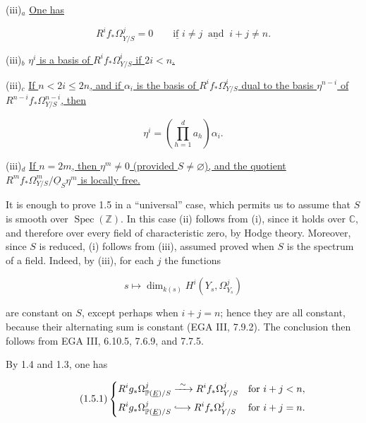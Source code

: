 \noindent(iii)$_a$ \underline{One has}

\begin{equation*}
R^if_*\Omega^j_{Y/S}=0
\qquad\underline{\text{if }}i\ne j\ \underline{\text{ and }}\ i+j\ne n.
\end{equation*}


\noindent(iii)$_b$ \underline{$\eta^i$ is a basis of
$R^if_*\Omega^i_{Y/S}$ if $2i<n$.}

\noindent(iii)$_c$ \underline{If $n<2i\leq2n$, and if $\alpha_i$ is the
basis of $R^if_*\Omega^i_{Y/S}$ dual to the basis $\eta^{n-i}$ of
$R^{n-i}f_*\Omega^{n-i}_{Y/S}$, then}

\begin{equation*}
\eta^i=\left(\prod_{h=1}^d a_h\right)\alpha_i.
\end{equation*}

\noindent(iii)$_d$ \underline{If $n=2m$, then $\eta^m\ne0$ (provided
$S\ne\varnothing$), and the quotient
$R^mf_*\Omega^m_{Y/S}/\underline O_S\eta^m$ is locally free.}

It is enough to prove 1.5 in a ``universal'' case, which permits us to
assume that $S$ is smooth over $\operatorname{Spec}(\mathbb Z)$.  In this
case (ii) follows from (i), since it holds over $\mathbb C$, and therefore
over every field of characteristic zero, by Hodge theory.  Moreover, since
$S$ is reduced, (i) follows from (iii), assumed proved when $S$ is the
spectrum of a field.  Indeed, by (iii), for each $j$ the functions

\begin{equation*}
s\longmapsto\dim_{k(s)}H^i(Y_s,\Omega^j_{Y_s})
\end{equation*}

are constant on $S$, except perhaps when $i+j=n$; hence they are all constant,
because their alternating sum is constant (EGA III, 7.9.2).  The conclusion
then follows from EGA III, 6.10.5, 7.6.9, and 7.7.5.

By 1.4 and 1.3, one has

\begin{equation}\tag{1.5.1}
\left\{
\begin{aligned}
R^ig_*\Omega^j_{\mathbb P(\underline E)/S}
&\xrightarrow{\ \sim\ }R^if_*\Omega^j_{Y/S}
&&\text{for }i+j<n,\\
R^ig_*\Omega^j_{\mathbb P(\underline E)/S}
&\lhook\joinrel\longrightarrow R^if_*\Omega^j_{Y/S}
&&\text{for }i+j=n.
\end{aligned}
\right.
\end{equation}

